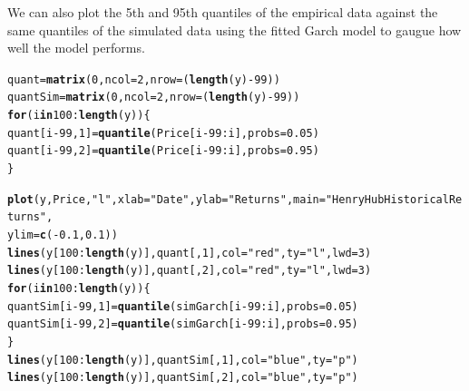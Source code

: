 \documentclass[10pt]{article}\usepackage[]{graphicx}\usepackage[]{color}
\makeatletter
\newcommand{\hlnum}[1]{\textcolor[rgb]{0.686,0.059,0.569}{#1}}%
\newcommand{\hlstr}[1]{\textcolor[rgb]{0.192,0.494,0.8}{#1}}%
\newcommand{\hlopt}[1]{\textcolor[rgb]{0,0,0}{#1}}%
\newcommand{\hlstd}[1]{\textcolor[rgb]{0.345,0.345,0.345}{#1}}%
\newcommand{\hlkwa}[1]{\textcolor[rgb]{0.161,0.373,0.58}{\textbf{#1}}}%
\newcommand{\hlkwb}[1]{\textcolor[rgb]{0.69,0.353,0.396}{#1}}%
\newcommand{\hlkwc}[1]{\textcolor[rgb]{0.333,0.667,0.333}{#1}}%
\newcommand{\hlkwd}[1]{\textcolor[rgb]{0.737,0.353,0.396}{\textbf{#1}}}%
\newenvironment{kframe}{%
 \def\at@end@of@kframe{}%
 \ifinner\ifhmode%
  \def\at@end@of@kframe{\end{minipage}}%
  \begin{minipage}{\columnwidth}%
 \fi\fi%
 \def\FrameCommand##1{\hskip\@totalleftmargin \hskip-\fboxsep
 \colorbox{shadecolor}{##1}\hskip-\fboxsep
     \hskip-\linewidth \hskip-\@totalleftmargin \hskip\columnwidth}%
 \MakeFramed {\advance\hsize-\width
   \@totalleftmargin\z@ \linewidth\hsize
   \@setminipage}}%
 {\par\unskip\endMakeFramed%
 \at@end@of@kframe}
\newenvironment{knitrout}{}{} %
\makeatother
\begin{document}
We can also plot the 5th and 95th quantiles of the empirical data against the same quantiles of the simulated data using the fitted Garch model to gaugue how well the model performs.
\begin{knitrout}
\color{fgcolor}\begin{kframe}
\begin{alltt}
\hlstd{quant} \hlkwb{=} \hlkwd{matrix}\hlstd{(}\hlnum{0}\hlstd{,} \hlkwc{ncol} \hlstd{=} \hlnum{2}\hlstd{,} \hlkwc{nrow} \hlstd{= (}\hlkwd{length}\hlstd{(y)} \hlopt{-} \hlnum{99}\hlstd{))}
\hlstd{quantSim} \hlkwb{=} \hlkwd{matrix}\hlstd{(}\hlnum{0}\hlstd{,} \hlkwc{ncol} \hlstd{=} \hlnum{2}\hlstd{,} \hlkwc{nrow} \hlstd{= (}\hlkwd{length}\hlstd{(y)} \hlopt{-} \hlnum{99}\hlstd{))}
\hlkwa{for} \hlstd{(i} \hlkwa{in} \hlnum{100}\hlopt{:}\hlkwd{length}\hlstd{(y)) \{}
    \hlstd{quant[i} \hlopt{-} \hlnum{99}\hlstd{,} \hlnum{1}\hlstd{]} \hlkwb{=} \hlkwd{quantile}\hlstd{(Price[i} \hlopt{-} \hlnum{99}\hlopt{:}\hlstd{i],} \hlkwc{probs} \hlstd{=} \hlnum{0.05}\hlstd{)}
    \hlstd{quant[i} \hlopt{-} \hlnum{99}\hlstd{,} \hlnum{2}\hlstd{]} \hlkwb{=} \hlkwd{quantile}\hlstd{(Price[i} \hlopt{-} \hlnum{99}\hlopt{:}\hlstd{i],} \hlkwc{probs} \hlstd{=} \hlnum{0.95}\hlstd{)}
\hlstd{\}}

\hlkwd{plot}\hlstd{(y, Price,} \hlstr{"l"}\hlstd{,} \hlkwc{xlab} \hlstd{=} \hlstr{"Date"}\hlstd{,} \hlkwc{ylab} \hlstd{=} \hlstr{"Returns"}\hlstd{,} \hlkwc{main} \hlstd{=} \hlstr{"Henry Hub Historical Returns"}\hlstd{,}
    \hlkwc{ylim} \hlstd{=} \hlkwd{c}\hlstd{(}\hlopt{-}\hlnum{0.1}\hlstd{,} \hlnum{0.1}\hlstd{))}
\hlkwd{lines}\hlstd{(y[}\hlnum{100}\hlopt{:}\hlkwd{length}\hlstd{(y)], quant[,} \hlnum{1}\hlstd{],} \hlkwc{col} \hlstd{=} \hlstr{"red"}\hlstd{,} \hlkwc{ty} \hlstd{=} \hlstr{"l"}\hlstd{,} \hlkwc{lwd} \hlstd{=} \hlnum{3}\hlstd{)}
\hlkwd{lines}\hlstd{(y[}\hlnum{100}\hlopt{:}\hlkwd{length}\hlstd{(y)], quant[,} \hlnum{2}\hlstd{],} \hlkwc{col} \hlstd{=} \hlstr{"red"}\hlstd{,} \hlkwc{ty} \hlstd{=} \hlstr{"l"}\hlstd{,} \hlkwc{lwd} \hlstd{=} \hlnum{3}\hlstd{)}
\hlkwa{for} \hlstd{(i} \hlkwa{in} \hlnum{100}\hlopt{:}\hlkwd{length}\hlstd{(y)) \{}
    \hlstd{quantSim[i} \hlopt{-} \hlnum{99}\hlstd{,} \hlnum{1}\hlstd{]} \hlkwb{=} \hlkwd{quantile}\hlstd{(simGarch[i} \hlopt{-} \hlnum{99}\hlopt{:}\hlstd{i],} \hlkwc{probs} \hlstd{=} \hlnum{0.05}\hlstd{)}
    \hlstd{quantSim[i} \hlopt{-} \hlnum{99}\hlstd{,} \hlnum{2}\hlstd{]} \hlkwb{=} \hlkwd{quantile}\hlstd{(simGarch[i} \hlopt{-} \hlnum{99}\hlopt{:}\hlstd{i],} \hlkwc{probs} \hlstd{=} \hlnum{0.95}\hlstd{)}
\hlstd{\}}
\hlkwd{lines}\hlstd{(y[}\hlnum{100}\hlopt{:}\hlkwd{length}\hlstd{(y)], quantSim[,} \hlnum{1}\hlstd{],} \hlkwc{col} \hlstd{=} \hlstr{"blue"}\hlstd{,} \hlkwc{ty} \hlstd{=} \hlstr{"p"}\hlstd{)}
\hlkwd{lines}\hlstd{(y[}\hlnum{100}\hlopt{:}\hlkwd{length}\hlstd{(y)], quantSim[,} \hlnum{2}\hlstd{],} \hlkwc{col} \hlstd{=} \hlstr{"blue"}\hlstd{,} \hlkwc{ty} \hlstd{=} \hlstr{"p"}\hlstd{)}
\end{alltt}
\end{kframe}


\end{knitrout}
\end{document}
